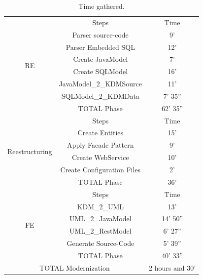 \documentclass[a4paper,twoside]{article}
\begin{document}


\begin{table}
\caption{Time gathered.}	
\begin{tabular}{|c|c|c|}
\hline 
\multirow{8}{*}{\begin{sideways}
RE
\end{sideways}} & Steps & Time\tabularnewline
\cline{2-3} 
 & Parser source-code & 9'\tabularnewline
\cline{2-3} 
 & Parser Embedded SQL & 12'\tabularnewline
\cline{2-3} 
 & Create JavaModel & 7'\tabularnewline
\cline{2-3} 
 & Create SQLModel & 16'\tabularnewline
\cline{2-3} 
 & JavaModel\_2\_KDMSource & 11'\tabularnewline
\cline{2-3} 
 & SQLModel\_2\_KDMData & 7' 35''\tabularnewline
\cline{2-3} 
 & \cellcolor{gray!25}TOTAL Phase & \cellcolor{gray!25}62' 35''\tabularnewline
\hline 
\multirow{6}{*}{\begin{sideways}
Reestructuring
\end{sideways}} & Steps & Time\tabularnewline
\cline{2-3} 
 & Create Entities & 15'\tabularnewline
\cline{2-3} 
 & Apply Facade Pattern & 9'\tabularnewline
\cline{2-3} 
 & Create WebService & 10'\tabularnewline
\cline{2-3} 
 & Create Configuration Files & 2'\tabularnewline
\cline{2-3} 
 & \cellcolor{gray!25}TOTAL Phase & \cellcolor{gray!25}36'\tabularnewline
\hline 
\multirow{6}{*}{\begin{sideways}
FE 
\end{sideways}} & Steps & Time\tabularnewline
\cline{2-3} 
 & KDM\_2\_UML & 13'\tabularnewline
\cline{2-3} 
 & UML\_2\_JavaModel & 14' 50''\tabularnewline
\cline{2-3} 
 & UML\_2\_RestModel & 6' 27''\tabularnewline
\cline{2-3} 
 & Generate Source-Code & 5' 39''\tabularnewline
\cline{2-3} 
 & \cellcolor{gray!25}TOTAL Phase & \cellcolor{gray!25}40' 33''\tabularnewline
\hline 
\multicolumn{2}{|c|}{\cellcolor{gray!25}TOTAL Modernization} & \cellcolor{gray!25}2 hours and 30'\tabularnewline
\hline 
\end{tabular}
\label{tab:time_each_step}

\end{table}
\end{document}
